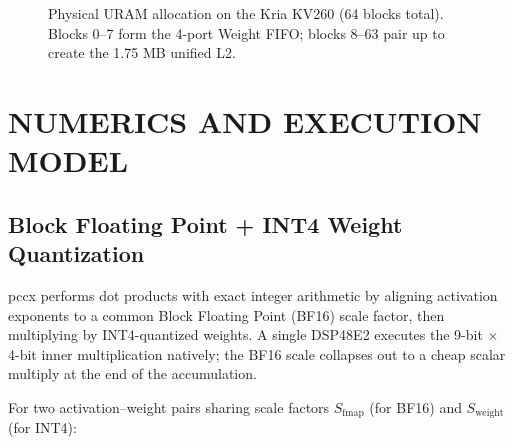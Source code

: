 \documentclass[11pt,a4paper,twoside,openany]{report}
\begin{document}
\begin{figure}[h]
\centering
{}
\caption{Physical URAM allocation on the Kria KV260 (64 blocks total).
Blocks 0--7 form the 4-port Weight FIFO; blocks 8--63 pair up to
create the 1.75 MB unified L2.}
\label{fig:uram-alloc}
\end{figure}

\newpage

\chapter{NUMERICS AND EXECUTION MODEL}

\section{Block Floating Point + INT4 Weight Quantization}

pccx performs dot products with exact integer arithmetic by aligning
activation exponents to a common Block Floating Point (BF16) scale
factor, then multiplying by INT4-quantized weights. A single
DSP48E2 executes the 9-bit $\times$ 4-bit inner multiplication
natively; the BF16 scale collapses out to a cheap scalar multiply
at the end of the accumulation.

For two activation--weight pairs sharing scale factors
$S_{\mathrm{fmap}}$ (for BF16) and $S_{\mathrm{weight}}$ (for INT4):
\end{document}
